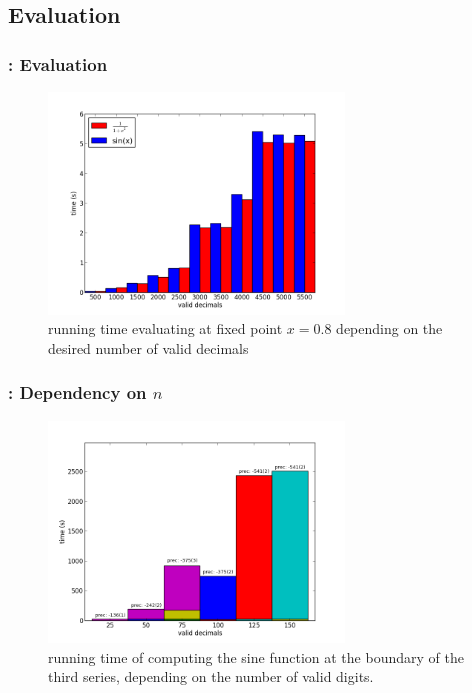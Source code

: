 \subsection{Evaluation}
\begin{frame}
\frametitle{: Evaluation}
			\begin{figure}[H]
				\centering
				\includegraphics[width=0.7\textwidth]{ba_ana_dep_on_n_bar.png}
				\caption{running time evaluating \baana at fixed point $x=0.8$ depending on the desired number of valid decimals}
				\label{fig:ba_ana dep on n}
			\end{figure}
\end{frame}
\begin{frame}
\frametitle{: Dependency on $n$}
		\begin{figure}[h]
			\centering
			\includegraphics[width=0.7\textwidth]{sin_for_series_4_dep_on_n.png}
			\caption{running time of \anarect computing the sine function at the boundary of the third series, depending on the number of valid digits. }
			\label{fig:sin dep on n}
		\end{figure}
\end{frame}
